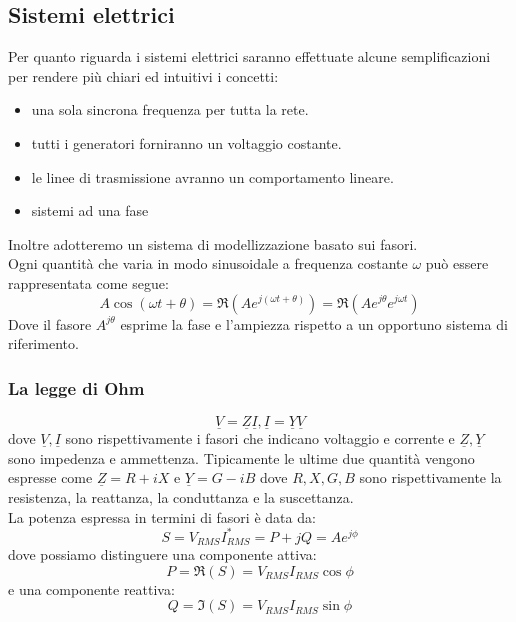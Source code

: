 \subsection{Sistemi elettrici}
Per quanto riguarda i sistemi elettrici saranno effettuate alcune semplificazioni per rendere più chiari ed intuitivi i concetti:
\begin{itemize}
\item una sola sincrona frequenza per tutta la rete.
\item tutti i generatori forniranno un voltaggio costante.
\item le linee di trasmissione avranno un comportamento lineare.
\item sistemi ad una fase
\end{itemize}
Inoltre adotteremo un sistema di modellizzazione basato sui fasori.\\
Ogni quantità che varia in modo sinusoidale a frequenza costante $\omega$ può essere rappresentata come segue:
$$A\cos(\omega t +\theta)= \Re(Ae^{j(\omega t+\theta)})=\Re(Ae^{j\theta}e^{j\omega t})$$
Dove il fasore $A^{j\theta}$ esprime la fase e l'ampiezza rispetto a un opportuno sistema di riferimento.
\subsubsection{La legge di Ohm}
$$\underline{V}=\underline{Z}\underline{I},\underline{I}=\underline{Y}\underline{V}$$
dove $\underline{V},\underline{I}$ sono rispettivamente i fasori che indicano voltaggio e corrente e $\underline{Z},\underline{Y}$ sono impedenza e ammettenza. Tipicamente le ultime due quantità vengono espresse come $\underline{Z}=R+iX$ e $\underline{Y}=G-iB$ dove $R,X,G,B$ sono rispettivamente la resistenza, la reattanza, la conduttanza e la suscettanza.\\
La potenza espressa in termini di fasori è data da:
$$S=V_{RMS}I^*_{RMS}=P+jQ=Ae^{j\phi}$$
dove possiamo distinguere una componente attiva:
$$P=\Re(S)=V_{RMS}I_{RMS}\cos \phi$$
e una componente reattiva:
$$Q=\Im(S)=V_{RMS}I_{RMS}\sin \phi$$
